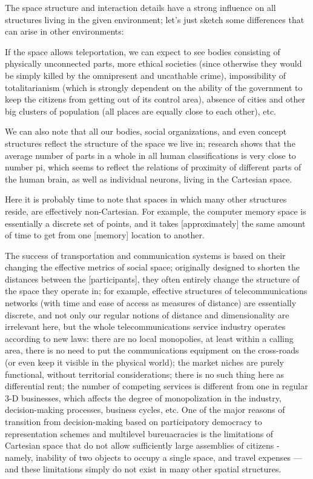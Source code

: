\vspace{5mm}
     The  space  structure  and  interaction  details  have  a  strong
influence  on  all  structures  living in the given environment; let's
just sketch some differences that can arise in other environments:

     If the space allows teleportation, we can expect to see  bodies
consisting  of  physically  unconnected  parts, more ethical societies
(since otherwise they would be simply killed by  the  omnipresent  and
uncathable crime), impossibility of totalitarianism (which is strongly
dependent on the ability of the government to keep the  citizens  from
getting  out  of  its  control  area), absence of cities and other big
clusters of population (all places are equally close to  each  other),
etc.

     We can also note that all our bodies, social  organizations,  and
even concept structures reflect the structure of the space we live in;
research shows that the average number of parts  in  a  whole  in  all
human  classifications  is  very  close  to  number pi, which seems to
reflect the relations of proximity of different  parts  of  the  human
brain, as well as individual neurons, living in the Cartesian space.

     Here it is probably time to note that spaces in which many  other
structures  reside,  are  effectively non-Cartesian.  For example, the
computer memory space is essentially a discrete set of points, and  it
takes [approximately] the same amount of time to get from one [memory]
location to another.

     The success of transportation and communication systems is  based
on  their  changing  the effective metrics of social space; originally
designed to shorten the distances  between  the  [participants],  they
often  entirely change the structure of the space they operate in; for
example, effective structures  of  telecommunications  networks  (with
time  and  ease  of  access  as  measures of distance) are essentially
discrete,  and  not  only  our  regular  notions   of   distance   and
dimensionality  are  irrelevant here, but the whole telecommunications
service industry operates according to new laws:  there are  no  local
monopolies,  at  least  within a calling area, there is no need to put
the communications equipment on  the  cross-roads  (or  even  keep  it
visible   in  the  physical  world);  the  market  niches  are  purely
functional, without territorial considerations; there is no such thing
here  as  differential  rent;  the  number  of  competing  services is
different from one in regular 3-D businesses, which affects the degree
of monopolization in the industry, decision-making processes, business
cycles,  etc.   One  of  the  major   reasons   of   transition   from
decision-making  based  on  participatory  democracy to representation
schemes and multilevel bureuacracies is the limitations  of  Cartesian
space  that  do  not allow sufficiently large assemblies of citizens -
namely, inability of two objects to occupy a single space, and  travel
expenses  ---  and  these  limitations simply do not exist in many other
spatial structures.

